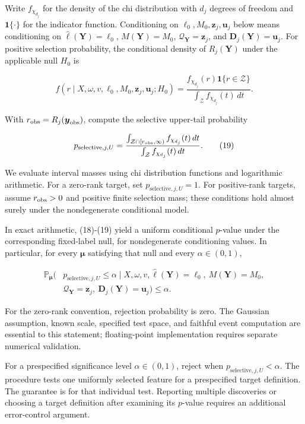 \documentclass[
  11pt,
]{article}
\begin{document}
Write \(f_{\chi_{d_j}}\) for the density of the chi distribution with
\(d_j\) degrees of freedom and \(\mathbf1\{\cdot\}\) for the indicator
function. Conditioning on \(\ell_0,M_0,\boldsymbol z_j,\boldsymbol u_j\)
below means conditioning on \(\widehat\ell(\boldsymbol Y)=\ell_0\),
\(M(\boldsymbol Y)=M_0\),
\(\mathcal Q_{\boldsymbol Y}=\boldsymbol z_j\), and
\(\boldsymbol D_j(\boldsymbol Y)=\boldsymbol u_j\). For positive
selection probability, the conditional density of \(R_j(\boldsymbol Y)\)
under the applicable null \(H_0\) is

\[
f(r\mid X,\omega,v,\ell_0,M_0,\boldsymbol z_j,\boldsymbol u_j;H_0)
=\frac{f_{\chi_{d_j}}(r)\mathbf1\{r\in\mathcal Z\}}
{\int_{\mathcal Z} f_{\chi_{d_j}}(t)\,dt}.
\tag{18}
\]

With \(r_{\rm obs}=R_j(\boldsymbol y_{\rm obs})\), compute the selective
upper-tail probability

\[
p_{\mathrm{selective},j,U}
=\frac{\int_{\mathcal Z\cap[r_{\rm obs},\infty)} f_{\chi_{d_j}}(t)\,dt}
{\int_{\mathcal Z} f_{\chi_{d_j}}(t)\,dt}.
\tag{19}
\]

We evaluate interval masses using chi distribution functions and
logarithmic arithmetic. For a zero-rank target, set
\(p_{\mathrm{selective},j,U}=1\). For positive-rank targets, assume
\(r_{\rm obs}>0\) and positive finite selection mass; these conditions
hold almost surely under the nondegenerate conditional model.

In exact arithmetic, (18)-(19) yield a uniform conditional \(p\)-value
under the corresponding fixed-label null, for nondegenerate conditioning
values. In particular, for every \(\boldsymbol\mu\) satisfying that null
and every \(\alpha\in(0,1)\),

\[
\begin{aligned}
\mathbb P_{\boldsymbol\mu}\!\bigl(&p_{\mathrm{selective},j,U}\le\alpha\mid
X,\omega,v,\widehat\ell(\boldsymbol Y)=\ell_0,\ M(\boldsymbol Y)=M_0,\\
&\mathcal Q_{\boldsymbol Y}=\boldsymbol z_j,\ \boldsymbol D_j(\boldsymbol Y)=\boldsymbol u_j\bigr)\le\alpha.
\end{aligned}
\tag{20}
\]

For the zero-rank convention, rejection probability is zero. The
Gaussian assumption, known scale, specified test space, and faithful
event computation are essential to this statement; floating-point
implementation requires separate numerical validation.

For a prespecified significance level \(\alpha\in(0,1)\), reject when
\(p_{\mathrm{selective},j,U}<\alpha\). The procedure tests one uniformly
selected feature for a prespecified target definition. The guarantee is
for that individual test. Reporting multiple discoveries or choosing a
target definition after examining its \(p\)-value requires an additional
error-control argument.
\end{document}
